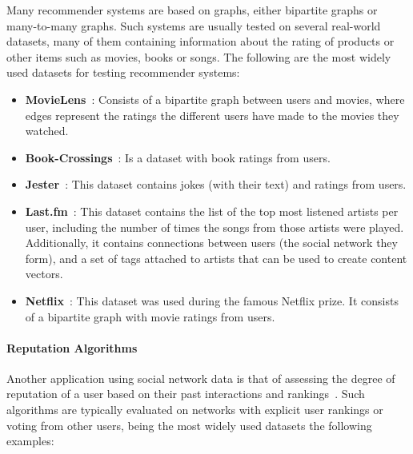 Many recommender systems are based on graphs, either bipartite graphs or
many-to-many graphs. Such systems are usually tested on several real-world datasets,
many of them containing information about the rating of products or other items such
as movies, books or songs. The following are the most widely used datasets for
testing recommender systems:

\begin{itemize}
\item \textbf{MovieLens}~\cite{movielens}: Consists of a bipartite graph
  between users and movies, where edges represent the ratings the different
  users have made to the movies they watched.
\item \textbf{Book-Crossings}~\cite{ziegler2005improving}: Is a dataset with book ratings
  from users.
\item \textbf{Jester}~\cite{goldberg2001eigentaste}: This dataset contains jokes (with
  their text) and ratings from users.
\item \textbf{Last.fm}~\cite{hetrec}: This dataset contains the list of the top
  most listened artists per user, including the number of times the songs from
  those artists were played. Additionally, it contains connections between users
  (the social network they form), and a set of tags attached to artists that can
  be used to create content vectors.
\item \textbf{Netflix}~\cite{zhou2008large}: This dataset was used during the famous
  Netflix prize. It consists of a bipartite graph with movie ratings from users.
\end{itemize}

\paragraph{Reputation Algorithms}

Another application using social network data is that of assessing the degree of
reputation of a user based on their past interactions and
rankings~\cite{kamvar2003eigentrust,katz2006social,kumar2016edge}. Such
algorithms are typically evaluated on networks with explicit user rankings or
voting from other users, being the most widely used datasets the following
examples:

